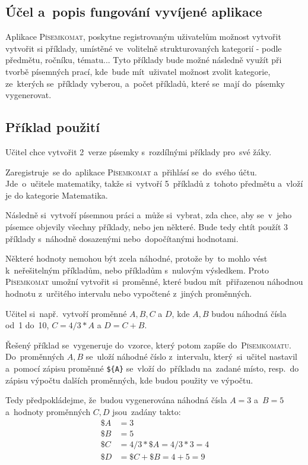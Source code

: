 \documentclass[14pt,a4paper]{article}
\begin{document}
        \subsection{Účel a~popis fungování vyvíjené aplikace}
        Aplikace \textsc{Písemkomat}, poskytne registrovaným uživatelům možnost vytvořit vytvořit si příklady, umístěné ve~volitelně
        strukturovaných kategorií - podle předmětu, ročníku, tématu... Tyto příklady bude možné následně využít při tvorbě písemných prací,
        kde~bude mít~uživatel možnost zvolit kategorie, ze~kterých se~příklady vyberou, a~počet příkladů, které se~mají do~písemky vygenerovat. 
        \subsection{Příklad použití}
        Učitel chce vytvořit 2~verze písemky s~rozdílnými příklady pro~své žáky.
        
        Zaregistruje~se do~aplikace \textsc{Písemkomat} a~přihlásí se~do~svého účtu. Jde~o~učitele matematiky, takže si~vytvoří 5~příkladů z~tohoto předmětu a~vloží je do kategorie Matematika.

        Následně si~vytvoří písemnou práci a~může si~vybrat, zda chce, aby se~v~jeho písemce objevily všechny příklady, nebo jen některé. Bude tedy chtít použít 3\,příklady s~náhodně dosazenými nebo~dopočítanými hodnotami.
        
        Některé hodnoty nemohou být zcela náhodné, protože by~to mohlo vést k~neřešitelným příkladům, nebo příkladům s~nulovým výsledkem.
        Proto \textsc{Písemkomat} umožní vytvořit si~proměnné, které budou mít~přiřazenou náhodnou hodnotu z~určitého intervalu nebo vypočtené z~jiných proměnných.

        Učitel si~např.~vytvoří proměnné $A, B, C$ a $D$, kde $A, B$ budou náhodná čísla od~1 do~10, $C = 4/3*A$ a $D = C + B$.

        Řešený příklad se~vygeneruje do~vzorce, který potom zapíše do~\textsc{Písemkomatu}. Do~proměnných $A, B$ se~uloží náhodné číslo z~intervalu, který~si~učitel nastavil a~pomocí zápisu proměnné \texttt{\$\{A\}} se~vloží do~příkladu na~zadané místo, resp.~do zápisu výpočtu dalších proměnných, kde budou použity ve výpočtu.
        
        Tedy předpokládejme, že~budou vygenerována náhodná čísla $A = 3$ a~$B = 5$
        a~hodnoty proměnných $C, D$ jsou~zadány takto:
        \begin{align*}
            \$A &= 3 \\
            \$B &= 5 \\
            \$C &= 4/3*\$A = 4/3*3 = 4 \\
            \$D &= \$C + \$B = 4 + 5 = 9
        \end{align*}
\end{document}
